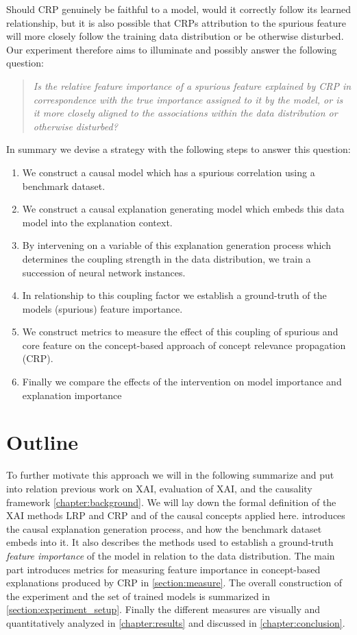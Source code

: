 Should CRP genuinely be faithful to a model, would it correctly follow its learned relationship, but it is also possible that CRPs attribution to the spurious feature will more closely follow the training data distribution or be otherwise disturbed. Our experiment therefore aims to illuminate and possibly answer the following question: 

\begin{quote}
\textit{Is the relative feature importance of a spurious feature explained by CRP in correspondence with the true importance assigned to it by the model, or is it more closely aligned to the associations within the data distribution or otherwise disturbed?}
\end{quote} 

\filbreak
In summary we devise a strategy with the following steps to answer this question:
\begin{enumerate}
    \item We construct a causal model which has a spurious correlation using a benchmark dataset.
    \item We construct a causal explanation generating model which embeds this data model into the explanation context.
    \item By intervening on a variable of this explanation generation process which determines the coupling strength in the data distribution, we train a succession of neural network instances.
    \item In relationship to this coupling factor we establish a ground-truth of the models (spurious) feature importance.
    \item We construct metrics to measure the effect of this coupling of spurious and core feature on the concept-based approach of concept relevance propagation (CRP).
    \item Finally we compare the effects of the intervention on model importance and explanation importance
\end{enumerate}
\filbreak

\section{Outline}
To further motivate this approach we will in the following summarize and put into relation previous work on XAI, evaluation of XAI, and the causality framework \cref{chapter:background}. We will lay down the formal definition of the XAI methods LRP and CRP and of the causal concepts applied here.
 introduces the causal explanation generation process, and how the benchmark dataset embeds into it. It also describes the methods used to establish a ground-truth \textit{feature importance} of the model in relation to the data distribution. 
The main part introduces metrics for measuring feature importance in concept-based explanations produced by CRP in \cref{section:measure}. The overall construction of the experiment and the set of trained models is summarized in \cref{section:experiment_setup}. Finally the different measures are visually and quantitatively analyzed in \cref{chapter:results} and discussed in \cref{chapter:conclusion}.
